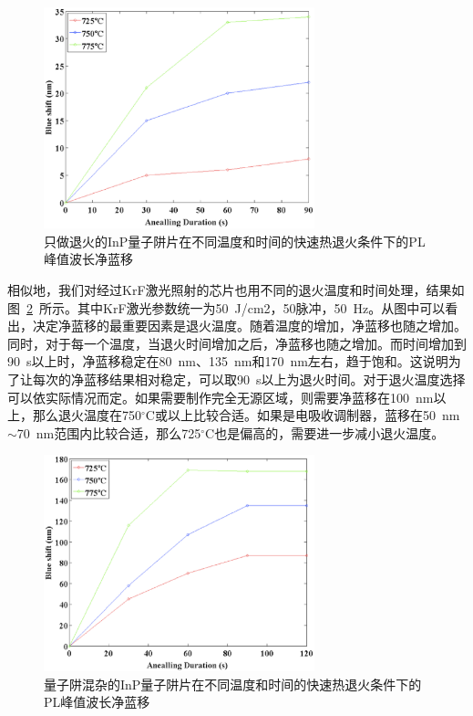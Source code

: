 \documentclass{ZJUthesis}
\begin{document}
\begin{figure}[htbp]
    \centering
    \includegraphics[width=0.7\textwidth]{./Pictures/heat_stability_shift.eps}
    \caption{只做退火的InP量子阱片在不同温度和时间的快速热退火条件下的PL峰值波长净蓝移}
    \label{fig_heat_stability_shift}
\end{figure}

相似地，我们对经过KrF激光照射的芯片也用不同的退火温度和时间处理，结果如图~\ref{fig_qwi_rta}~所示。其中KrF激光参数统一为50~J/cm2，50脉冲，50~Hz。从图中可以看出，决定净蓝移的最重要因素是退火温度。随着温度的增加，净蓝移也随之增加。同时，对于每一个温度，当退火时间增加之后，净蓝移也随之增加。而时间增加到90~s以上时，净蓝移稳定在80~nm、135~nm和170~nm左右，趋于饱和。这说明为了让每次的净蓝移结果相对稳定，可以取90~s以上为退火时间。对于退火温度选择可以依实际情况而定。如果需要制作完全无源区域，则需要净蓝移在100~nm以上，那么退火温度在750$^{\circ}$C或以上比较合适。如果是电吸收调制器，蓝移在50~nm$\sim$70~nm范围内比较合适，那么725$^{\circ}$C也是偏高的，需要进一步减小退火温度。

\begin{figure}[htbp]
    \centering
    \includegraphics[width=0.7\textwidth]{./Pictures/qwi_rta.eps}
    \caption{量子阱混杂的InP量子阱片在不同温度和时间的快速热退火条件下的PL峰值波长净蓝移}
    \label{fig_qwi_rta}
\end{figure}
\end{document}
